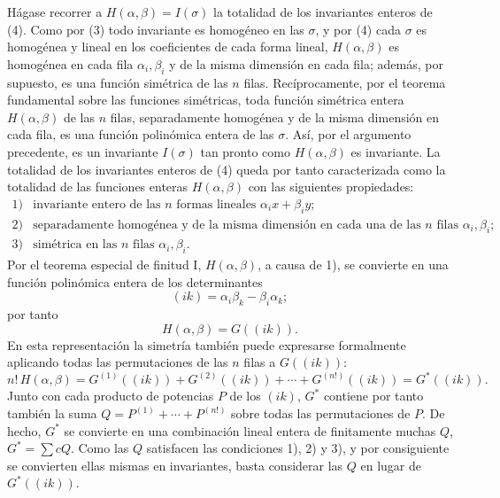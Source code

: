 \documentclass[11pt]{article}
\begin{document}
Hágase recorrer a \(H(\alpha,\beta)=I(\sigma)\) la totalidad de los invariantes enteros de (4). Como por (3) todo invariante es homogéneo en las \(\sigma\), y por (4) cada \(\sigma\) es homogénea y lineal en los coeficientes de cada forma lineal, \(H(\alpha,\beta)\) es homogénea en cada fila \(\alpha_i,\beta_i\) y de la misma dimensión en cada fila; además, por supuesto, es una función simétrica de las \(n\) filas. Recíprocamente, por el teorema fundamental sobre las funciones simétricas, toda función simétrica entera \(H(\alpha,\beta)\) de las \(n\) filas, separadamente homogénea y de la misma dimensión en cada fila, es una función polinómica entera de las \(\sigma\). Así, por el argumento precedente, es un invariante \(I(\sigma)\) tan pronto como \(H(\alpha,\beta)\) es invariante. La totalidad de los invariantes enteros de (4) queda por tanto caracterizada como la totalidad de las funciones enteras \(H(\alpha,\beta)\) con las siguientes propiedades:
\[
\begin{array}{ll}
1) & \text{invariante entero de las \(n\) formas lineales \(\alpha_i x+\beta_i y\);}\\
2) & \text{separadamente homogénea y de la misma dimensión en cada una de las \(n\) filas \(\alpha_i,\beta_i\);}\\
3) & \text{simétrica en las \(n\) filas \(\alpha_i,\beta_i\).}
\end{array}
\]
Por el teorema especial de finitud I, \(H(\alpha,\beta)\), a causa de 1), se convierte en una función polinómica entera de los determinantes
\[
        (ik)=\alpha_i\beta_k-\beta_i\alpha_k;
\]
por tanto
\[
        H(\alpha,\beta)=G((ik)).
\]
En esta representación la simetría también puede expresarse formalmente aplicando todas las permutaciones de las \(n\) filas a \(G((ik))\):
\begin{equation}
        n!\,H(\alpha,\beta)
        =
        G^{(1)}((ik))+G^{(2)}((ik))+\cdots+G^{(n!)}((ik))
        =G^*((ik)).
\end{equation}
Junto con cada producto de potencias \(P\) de los \((ik)\), \(G^*\) contiene por tanto también la suma \(Q=P^{(1)}+\cdots+P^{(n!)}\) sobre todas las permutaciones de \(P\). De hecho, \(G^*\) se convierte en una combinación lineal entera de finitamente muchas \(Q\), \(G^*=\sum cQ\). Como las \(Q\) satisfacen las condiciones 1), 2) y 3), y por consiguiente se convierten ellas mismas en invariantes, basta considerar las \(Q\) en lugar de \(G^*((ik))\).
\end{document}
